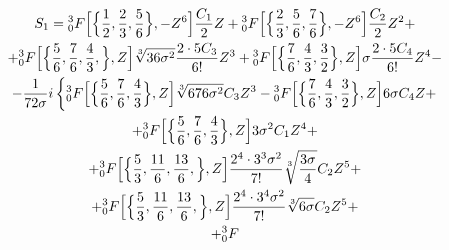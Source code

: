 \begin{multline}

\label{eq:Aristov_Prosviryakov:solstress}

S_1= {^{3}_{0}F} 

\Bigl[\Bigl\{\frac{1}{2}, \frac{2}{3}, \frac{5}{6}\Bigr\},-Z^6\Bigr] \frac{C_1}{2}Z+

{^{3}_{0}F} 

\Bigl[\Bigl\{\frac{2}{3}, \frac{5}{6}, \frac{7}{6}\Bigr\},-Z^6\Bigr] \frac{C_2}{2}Z^2+

\\

+{^{3}_{0}F} 

\Bigl[\Bigl\{\frac{5}{6}, \frac{7}{6}, \frac{4}{3},\Bigr\},Z\Bigr] \sqrt[3]{36\sigma^2} \frac{2\cdot 5C_3}{6!}Z^3+

{^{3}_{0}F} 

\Bigl[\Bigl\{\frac{7}{6}, \frac{4}{3}, \frac{3}{2}\Bigr\},Z\Bigr] \sigma \frac{2\cdot 5C_4}{6!}Z^4-

\\

-\frac{1}{72\sigma}i\left\{ {^{3}_{0}F} 

\Bigl[\Bigl\{\frac{5}{6}, \frac{7}{6}, \frac{4}{3}\Bigr\},Z\Bigr] \sqrt[3]{676\sigma^2} C_3 Z^3 

-{^{3}_{0}F} 

\Bigl[\Bigl\{\frac{7}{6}, \frac{4}{3}, \frac{3}{2}\Bigr\},Z\Bigr] 6 \sigma C_4 Z+

\right.

\\

+{^{3}_{0}F} 

\Bigl[\Bigl\{\frac{5}{6}, \frac{7}{6}, \frac{4}{3}\Bigr\},Z\Bigr] 3 \sigma^2 C_1 Z^4 +

\\

+{^{3}_{0}F} 

\Bigl[\Bigl\{\frac{5}{3}, \frac{11}{6}, \frac{13}{6},\Bigr\},Z\Bigr] \frac{2^4\cdot 3^3\sigma^2}{7!}\sqrt[3]{\frac{3\sigma}{4}} C_2 Z^5

+

\\

+{^{3}_{0}F} 

\Bigl[\Bigl\{\frac{5}{3}, \frac{11}{6}, \frac{13}{6},\Bigr\},Z\Bigr] \frac{2^4\cdot 3^4\sigma^2}{7!}\sqrt[3]{6\sigma} C_2 Z^5+

\\

+{^{3}_{0}F} 


\end{multline}
